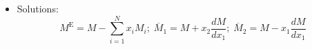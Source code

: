 \documentclass[calculator,allquestions,datasheet]{exam_newMarcus2}
\newcommand{\frc}{\displaystyle\frac}
\begin{document}
\begin{itemize}
\item Solutions:\\
\begin{displaymath}
M^{\text{E}} = M - \sum\limits_{i=1}^{N} x_{i}M_{i}; \; \overline{M}_{1}=M+x_{2}\frc{d M}{dx_{1}};\; \overline{M}_{2} = M - x_{1}\frc{d M}{dx_{1}}
\end{displaymath}

\end{itemize}


\vfill 



{
%  
  
}
\end{document}
